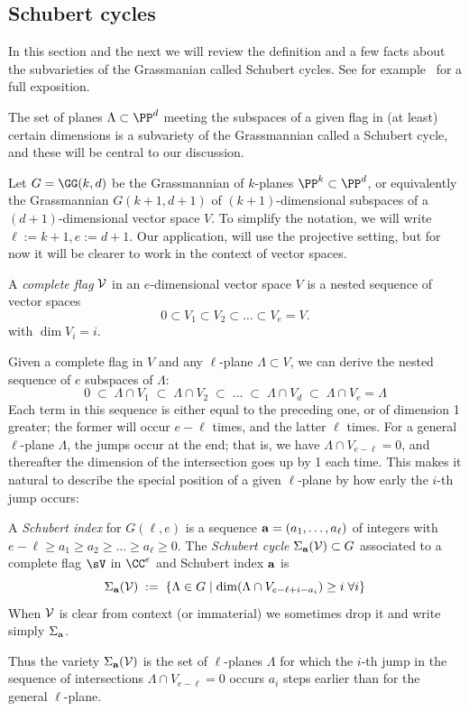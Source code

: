 \subsection{Schubert cycles}\label{Schubert1}

In this section and the next we will review the definition and a few facts about the subvarieties of the Grassmanian called Schubert cycles.
See for example~\cite[Chapters 3 and 4]{3264} for a full exposition.

The set of planes $\Lambda \subset \PP^d$ meeting  the subspaces of a given flag in (at least) certain dimensions
is a subvariety of the Grassmannian called a Schubert cycle, and these will be central to our discussion.

Let $G = \GG(k, d)$ be the Grassmannian of $k$-planes $\PP^k \subset \PP^d$, or equivalently the Grassmannian $G(k+1,d+1)$ of $(k+1)$-dimensional subspaces of a $(d+1)$-dimensional vector space $V$.
To simplify the notation, we will write $\ell := k+1, e:= d+1$.
Our application, will use the projective setting, but for now it will be clearer to work in the context  of vector spaces.

\begin{definition}
A \emph{complete flag} $\cal V$  in an $e$-dimensional vector space $V$ is a nested sequence of vector spaces
$$
0 \subset V_1 \subset V_2 \subset \dots  \subset V_{e} = V.
$$
with $\dim V_i = i$.
\end{definition}

Given a complete flag in $V$ and any  $\ell$-plane $\Lambda \subset V$, we can derive the nested sequence of $e$ subspaces of $\Lambda$:
$$
0 \; \subset \; \Lambda \cap V_1 \; \subset \;  \Lambda \cap V_2 \; \subset \;  \dots \; \subset \;  \Lambda \cap V_d \; \subset \;  \Lambda \cap V_{e} = \Lambda
$$
Each term in this sequence is either equal to the preceding one, or of dimension 1 greater; the former will occur $e-\ell$ times, and the latter $\ell$ times. For a general $\ell $-plane $\Lambda$, the jumps occur at the end; that is, we have $\Lambda \cap V_{e-\ell} = 0$, and thereafter the dimension of the intersection goes up by 1 each time. This makes it natural
to describe the special position of a given $\ell $-plane by how early the $i$-th jump occurs: 

\begin{definition}
A \emph{Schubert index} for $G(\ell, e)$ is a sequence ${\bf a} = (a_1,\dots,a_{\ell})$ of integers with $e-\ell \geq a_1 \geq a_2 \geq \dots \geq a_{\ell} \geq 0$.
The \emph{Schubert cycle $\Sigma_{\bf a}({\cal V}) \subset G$} associated to a complete flag $\sV$ in $\CC^e$ and
Schubert index $\bf a$  is 
$$
\Sigma_{\bf a}({\cal V}) \; := \; \left\{ \Lambda \in G \mid \dim(\Lambda \cap V_{e-\ell+i-a_i}) \geq i \; \forall i \right\}
$$
When $\cal V$ is clear from context (or immaterial) we sometimes drop it and write simply $\Sigma_{\bf a}$.
\end{definition}
Thus the variety  $\Sigma_{\bf a}({\cal V})$ is the set of $\ell $-planes $\Lambda$ for which the $i$-th jump in the sequence of intersections $\Lambda \cap V_{e-\ell} = 0$ occurs
$a_i$ steps earlier than for the general $\ell $-plane. 

